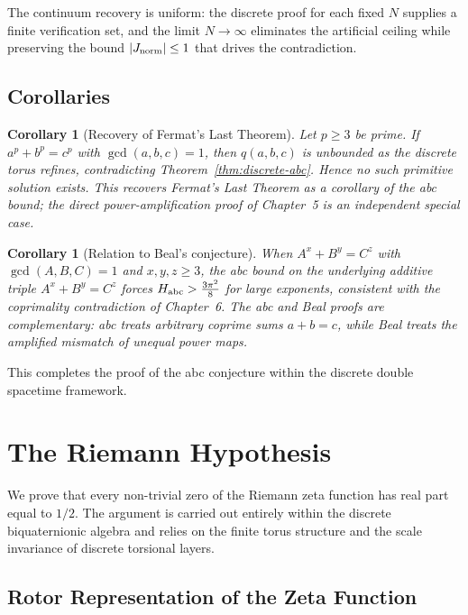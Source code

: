 \documentclass[dvipdfmx,a4paper]{article}
\newtheorem{corollary}[theorem]{Corollary}
\theoremstyle{definition}
\theoremstyle{remark}
\newcommand{\Jnorm}{J_{\rm norm}}
\newcommand{\Jbound}{\frac{3\pi^2}{8}}
\begin{document}
The continuum recovery is uniform: the discrete proof for each fixed \( N \) supplies a finite verification set, and the limit \( N \to \infty \) eliminates the artificial ceiling while preserving the bound \( |\Jnorm| \leq 1 \) that drives the contradiction.

\subsection{Corollaries}

\begin{corollary}[Recovery of Fermat's Last Theorem]
\label{cor:abc-flt}
Let \( p \geq 3 \) be prime. If \( a^p + b^p = c^p \) with \( \gcd(a,b,c) = 1 \), then \( q(a,b,c) \) is unbounded as the discrete torus refines, contradicting Theorem~\ref{thm:discrete-abc}. Hence no such primitive solution exists. This recovers Fermat's Last Theorem as a corollary of the abc bound; the direct power-amplification proof of Chapter~5 is an independent special case.
\end{corollary}

\begin{corollary}[Relation to Beal's conjecture]
\label{cor:abc-beal}
When \( A^x + B^y = C^z \) with \( \gcd(A,B,C) = 1 \) and \( x,y,z \geq 3 \), the abc bound on the underlying additive triple \( A^x + B^y = C^z \) forces \( H_{\rm abc} > \Jbound \) for large exponents, consistent with the coprimality contradiction of Chapter~6. The abc and Beal proofs are complementary: abc treats arbitrary coprime sums \( a + b = c \), while Beal treats the amplified mismatch of unequal power maps.
\end{corollary}

This completes the proof of the abc conjecture within the discrete double spacetime framework.

\section{The Riemann Hypothesis}

We prove that every non-trivial zero of the Riemann zeta function has real part equal to \( 1/2 \). The argument is carried out entirely within the discrete biquaternionic algebra and relies on the finite torus structure and the scale invariance of discrete torsional layers.

\subsection{Rotor Representation of the Zeta Function}
\end{document}
